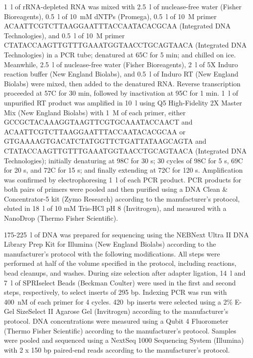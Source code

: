 \documentclass[main.tex]{subfiles}
\begin{document}
1~\textmu l of rRNA-depleted RNA was mixed with 2.5~\textmu l of nuclease-free water (Fisher Bioreagents), 0.5~\textmu l of 10~mM dNTPs (Promega), 0.5~\textmu l of 10~\textmu M primer ACAATTCGTCTTAAGGAATTTACCAATACACGCAA (Integrated DNA Technologies), and 0.5~\textmu l of 10~\textmu M primer CTATACCAAGTTGTTTGAAATGGTAACCTGCAGTAACA (Integrated DNA Technologies) in a PCR tube; denatured at 65\textdegree C for 5 min; and chilled on ice.
Meanwhile, 2.5~\textmu l of nuclease-free water (Fisher Bioreagents), 2~\textmu l of 5X Induro reaction buffer (New England Biolabs), and 0.5~\textmu l of Induro RT (New England Biolabs) were mixed, then added to the denatured RNA.
Reverse transcription proceeded at 57\textdegree C for 30 min, followed by inactivation at 95\textdegree C for 1 min.
1~\textmu l of unpurified RT product was amplified in 10~\textmu l using Q5 High-Fidelity 2X Master Mix (New England Biolabs) with 1~\textmu M of each primer, either GCCGCTACAAAGGTAAGTTCGTGCAAATACCAACT and ACAATTCGTCTTAAGGAATTTACCAATACACGCAA or GTGAAAAGTGACATCTATGGTTCTGATTATAAGCAGTA and CTATACCAAGTTGTTTGAAATGGTAACCTGCAGTAACA (Integrated DNA Technologies); initially denaturing at 98\textdegree C for 30 s; 30 cycles of 98\textdegree C for 5 s, 69\textdegree C for 20 s, and 72\textdegree C for 15 s; and finally extending at 72\textdegree C for 120 s.
Amplification was confirmed by electrophoresing 1~\textmu l of each PCR product.
PCR products for both pairs of primers were pooled and then purified using a DNA Clean \& Concentrator-5 kit (Zymo Research) according to the manufacturer's protocol, eluted in 18~\textmu l of 10 mM Tris-HCl pH 8 (Invitrogen), and measured with a NanoDrop (Thermo Fisher Scientific).

175-225~\textmu l of DNA was prepared for sequencing using the NEBNext Ultra II DNA Library Prep Kit for Illumina (New England Biolabs) according to the manufacturer's protocol with the following modifications.
All steps were performed at half of the volume specified in the protocol, including reactions, bead cleanups, and washes.
During size selection after adapter ligation, 14~\textmu l and 7~\textmu l of SPRIselect Beads (Beckman Coulter) were used in the first and second steps, respectively, to select inserts of 295 bp.
Indexing PCR was run with 400~nM of each primer for 4 cycles.
420~bp inserts were selected using a 2\% E-Gel SizeSelect II Agarose Gel (Invitrogen) according to the manufacturer's protocol.
DNA concentrations were measured using a Qubit 4 Fluorometer (Thermo Fisher Scientific) according to the manufacturer's protocol.
Samples were pooled and sequenced using a NextSeq 1000 Sequencing System (Illumina) with 2 x 150 bp paired-end reads according to the manufacturer's protocol.
\end{document}
